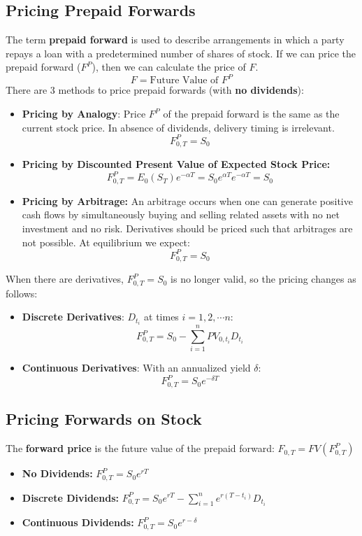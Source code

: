\documentclass[11pt]{article}
\begin{document}
\subsection{Pricing Prepaid Forwards}
The term \textbf{prepaid forward} is used to describe arrangements in which a party repays a loan with a predetermined number of shares of stock. If we can price the prepaid forward ($F^P$), then we can calculate the price of $F$.
$$ F = \text{Future Value of } F^P $$
There are 3 methods to price prepaid forwards (with \textbf{no dividends}):
\begin{itemize}
\item \textbf{Pricing by Analogy}: Price $F^P$ of the prepaid forward is the same as the current stock price.  In absence of dividends, delivery timing is irrelevant. $$ F^P_{0,T} = S_0$$
\item \textbf{Pricing by Discounted Present Value of Expected Stock Price:}
$$ F^P_{0,T} = E_0 (S_T)e^{-\alpha T} = S_0 e^{\alpha T} e^{- \alpha T} = S_0$$
\item \textbf{Pricing by Arbitrage:} An arbitrage occurs when one can generate positive cash flows by simultaneously buying and selling related assets with no net investment and no risk.  Derivatives should be priced such that arbitrages are not possible. At equilibrium we expect:
$$ F_{0,T}^P = S_0$$
\end{itemize}
When there are derivatives,  $ F_{0,T}^P = S_0$ is no longer valid, so the pricing changes as follows: 
\begin{itemize}
\item \textbf{Discrete Derivatives}: $D_{t_i}$ at times $i = 1, 2, \cdots n$: $$F_{0,T}^P = S_0 - \sum_{i=1}^n PV_{0,t_i} D_{t_i}$$
\item \textbf{Continuous Derivatives}: With an annualized yield $\delta$:
$$F_{0,T}^P = S_0e^{-\delta T}$$
\end{itemize} 
\pagebreak
\subsection{Pricing Forwards on Stock}
The \textbf{forward price } is the future value of the prepaid forward: $F_{0,T} = FV(F^P_{0,T})$
\begin{itemize}
\item \textbf{No Dividends:} $ F_{0,T}^P = S_0 e^{r T}$
\item \textbf{Discrete Dividends: } $F_{0,T}^P = S_0e^{rT} - \sum_{i=1}^n e^{r(T-t_i)} D_{t_i}$
\item \textbf{Continuous Dividends:} $ F_{0,T}^P = S_0 e^{r - \delta}$
\end{itemize}
\end{document}
